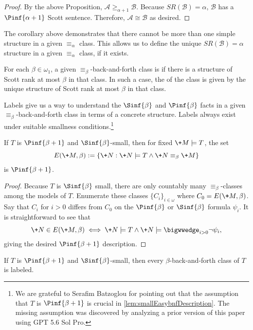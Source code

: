 \documentclass{amsart}
\renewcommand{\-}{\text{-}}
\begin{document}
\begin{proof}
    By the above Proposition, $\mathcal{A}\geq_{\alpha+1}\mathcal{B}$.
    Because $SR(\mathcal{B})=\alpha$, $\mathcal{B}$ has a $\Pinf{\alpha+1}$ Scott sentence.
    Therefore, $\mathcal{A}\cong\mathcal{B}$ as desired.
\end{proof}

The corollary above demonstrates that there cannot be more than one simple structure in a given $\equiv_{\alpha}$ class.
This allows us to define the unique $SR(\mathcal{B})=\alpha$ structure in a given $\equiv_{\alpha}$ class, if it exists.

\begin{definition}
For each $\beta\in\omega_1$, a given $\equiv_\beta$-back-and-forth class is  if there is a structure of Scott rank at most $\beta$ in that class.
In such a case, the  of the class is given by the unique structure of Scott rank at most $\beta$ in that class.
\end{definition}

Labels give us a way to understand the $\Sinf{\beta}$ and $\Pinf{\beta}$ facts in a given $\equiv_\beta$-back-and-forth class in terms of a concrete structure.
Labels always exist under suitable smallness conditions.\footnote{We are grateful to Serafim Batzoglou for pointing out that the assumption that $T$ is $\Pinf{\beta+1}$ is crucial in \cref{lem:smallEasybnfDescription}. The missing assumption was discovered by analyzing a prior version of this paper using GPT 5.6 Sol Pro.}

\begin{lemma}\label{lem:smallEasybnfDescription}
  If $T$ is $\Pinf{\beta+1}$  and $\Sinf{\beta}$-small, then for fixed $\+M\models T$, the set
\[E(\+M,\beta):=\{\+N : \+N\models T \land \+N\equiv_\beta \+M\}\]
is $\Pinf{\beta+1}$.
\end{lemma}

\begin{proof}
Because $T$ is $\Sinf{\beta}$ small, there are only countably many $\equiv_\beta$-classes among the models of $T$.
Enumerate these classes $\{C_i\}_{i\in\omega}$ where $C_0= E(\+M,\beta)$.
Say that $C_i$ for $i>0$ differs from $C_0$ on the $\Pinf{\beta}$ or $\Sinf{\beta}$ formula $\psi_i$.
It is straightforward to see that
\[\+N\in E(\+M,\beta) \iff \+N\models T \land \+N\models\bigwwedge_{i>0} \lnot\psi_i,\]
giving the desired $\Pinf{\beta+1}$ description.
\end{proof}

\begin{corollary}\label{cor:allClassesLabeled}
  If $T$ is $\Pinf{\beta+1}$ and $\Sinf{\beta}$-small, then every $\beta$-back-and-forth class of $T$ is labeled.
\end{corollary}
\end{document}
